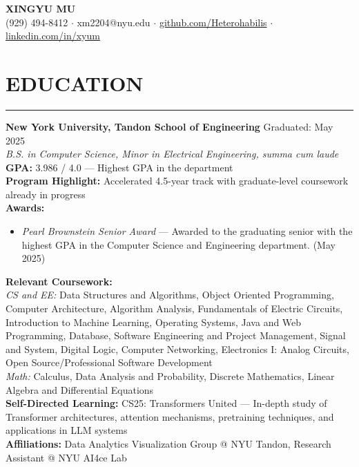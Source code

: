 \documentclass[letterpaper,10pt]{article}
\begin{document}
	
	\begin{center}
		{\textbf{\Huge X\huge INGYU \Huge M\huge U}} \\[0.3em]
		(929) 494-8412 $\cdot$ xm2204@nyu.edu $\cdot$ \href{https://github.com/Heterohabilis}{github.com/Heterohabilis} $\cdot$ \href{https://linkedin.com/in/xyum}{linkedin.com/in/xyum}
	\end{center}
	
	\section*{EDUCATION}
        \hrule
        \textbf{New York University, Tandon School of Engineering} \hfill Graduated: May 2025\\
        \textit{B.S. in Computer Science, Minor in Electrical Engineering, summa cum laude} \\
        \textbf{GPA:} 3.986 / 4.0 — Highest GPA in the department\\
        \textbf{Program Highlight:} Accelerated 4.5-year track with graduate-level coursework already in progress\\
        \textbf{Awards:}
        \begin{itemize}[leftmargin=*]
            \item \textit{Pearl Brownstein Senior Award} — Awarded to the graduating senior with the highest GPA in the Computer Science and Engineering department. (May 2025)
        \end{itemize}
        \textbf{Relevant Coursework:} \\
        \textit{CS and EE:} Data Structures and Algorithms, Object Oriented Programming, Computer Architecture, Algorithm Analysis, Fundamentals of Electric Circuits, Introduction to Machine Learning, Operating Systems, Java and Web Programming, Database, Software Engineering and Project Management, Signal and System, Digital Logic, Computer Networking, Electronics I: Analog Circuits, Open Source/Professional Software Development\\
        \textit{Math:} Calculus, Data Analysis and Probability, Discrete Mathematics, Linear Algebra and Differential Equations\\
        \textbf{Self-Directed Learning:} CS25: Transformers United — In-depth study of Transformer architectures, attention mechanisms, pretraining techniques, and applications in LLM systems \\
        \textbf{Affiliations:} Data Analytics Visualization Group @ NYU Tandon, Research Assistant @ NYU AI4ce Lab \\
    
\end{document}
